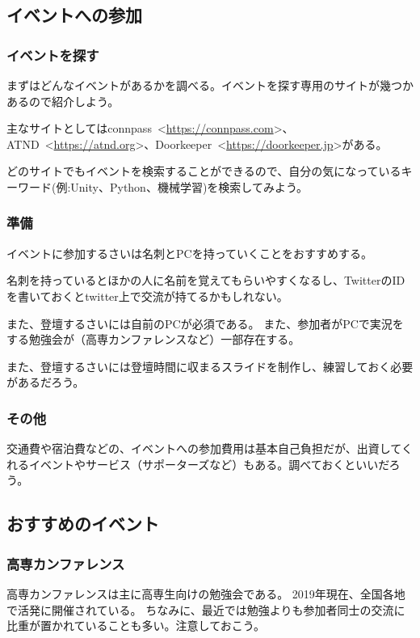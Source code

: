 \documentclass[lualatex,ja=standard,12pt,a4j]{bxjsbook}
\begin{document}
			\subsection{イベントへの参加}
				\subsubsection{イベントを探す}
					まずはどんなイベントがあるかを調べる。イベントを探す専用のサイトが幾つかあるので紹介しよう。
					
					主なサイトとしてはconnpass\ <\url{https://connpass.com}>、ATND\ <\url{https://atnd.org}>、Doorkeeper\ <\url{https://doorkeeper.jp}>がある。
					
					どのサイトでもイベントを検索することができるので、自分の気になっているキーワード(例:Unity、Python、機械学習)を検索してみよう。
				\subsubsection{準備}
					イベントに参加するさいは名刺とPCを持っていくことをおすすめする。
					
					名刺を持っているとほかの人に名前を覚えてもらいやすくなるし、TwitterのIDを書いておくとtwitter上で交流が持てるかもしれない。
					
					また、登壇するさいには自前のPCが必須である。
                    また、参加者がPCで実況をする勉強会が（高専カンファレンスなど）一部存在する。
					
					また、登壇するさいには登壇時間に収まるスライドを制作し、練習しておく必要があるだろう。
					
					\subsubsection{その他}
						交通費や宿泊費などの、イベントへの参加費用は基本自己負担だが、出資してくれるイベントやサービス（サポーターズなど）もある。調べておくといいだろう。
			\subsection{おすすめのイベント}
				\subsubsection{高専カンファレンス}
					高専カンファレンスは主に高専生向けの勉強会である。
					2019年現在、全国各地で活発に開催されている。
					ちなみに、最近では勉強よりも参加者同士の交流に比重が置かれていることも多い。注意しておこう。
					
\end{document}

